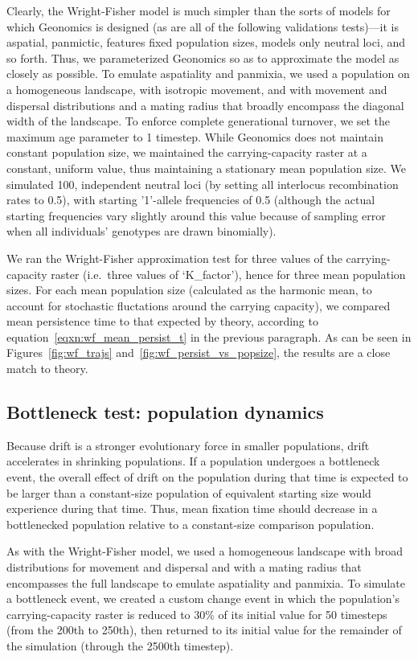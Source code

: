 ﻿\documentclass{article}
\begin{document}
Clearly, the Wright-Fisher model is much simpler than the sorts of models for which
Geonomics is designed (as are all of the following validations tests)---it is aspatial,
panmictic, features fixed population sizes, models only neutral loci, and so forth. 
Thus, we parameterized Geonomics so as to approximate the model as closely as possible.
To emulate aspatiality and panmixia, we used a population on a homogeneous landscape,
with isotropic movement, and with movement and dispersal distributions
and a mating radius that broadly encompass the diagonal width of the landscape.
To enforce complete generational turnover, we set the
maximum age parameter to 1 timestep. While Geonomics does not maintain constant population
size, we maintained the carrying-capacity raster at a constant, uniform value, thus
maintaining a stationary mean population size. We simulated 100, independent neutral
loci (by setting all interlocus recombination rates to 0.5), with starting '1'-allele
frequencies of 0.5 (although the actual starting frequencies vary slightly around
this value because of sampling error when all individuals' genotypes are drawn binomially).

We ran the Wright-Fisher approximation test for three values of the
carrying-capacity raster (i.e.\ three values of `K\_factor'), hence for three mean
population sizes. For each mean population size (calculated as the harmonic mean,
to account for stochastic fluctations around the carrying capacity), we compared
mean persistence time to that
expected by theory, according to equation~\ref{eqxn:wf_mean_persist_t} in the previous paragraph. As can be
seen in Figures~\ref{fig:wf_trajs} and~\ref{fig:wf_persist_vs_popsize}, the results are a close match to theory.


\subsection{Bottleneck test: population dynamics}
Because drift is a stronger evolutionary force in smaller populations,
drift accelerates in shrinking populations. 
If a population undergoes a bottleneck event, the overall effect of drift on the population
during that time is expected to be larger than a constant-size population of equivalent
starting size would experience during that time. 
Thus, mean fixation time should decrease in a bottlenecked population
relative to a constant-size comparison population.

As with the Wright-Fisher model, we used a homogeneous landscape with broad distributions
for movement and dispersal and with a mating radius that encompasses the full landscape
to emulate aspatiality and panmixia. To simulate a bottleneck event,
we created a custom change event in which the population's carrying-capacity raster
is reduced to 30\% of its initial value for 50 timesteps (from the 200th to 250th),
then returned to its initial value for the remainder of the simulation
(through the 2500th timestep).
\end{document}

